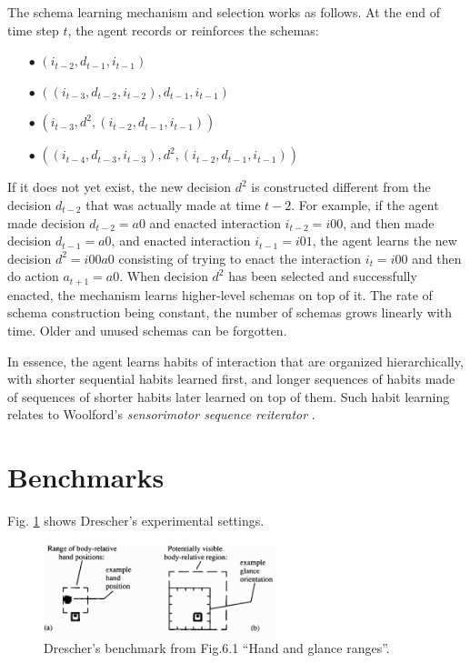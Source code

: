 \documentclass[runningheads]{llncs}
\begin{document}
The schema learning mechanism and selection works as follows.
At the end of time step $t$, the agent records or reinforces the schemas: 
\begin{itemize}
	\item[$\bullet$] $(i_{t-2}, d_{t-1}, i_{t-1})$
	\item[$\bullet$] $((i_{t-3}, d_{t-2}, i_{t-2}), d_{t-1}, i_{t-1})$
	\item[$\bullet$] $(i_{t-3}, d^2, (i_{t-2}, d_{t-1}, i_{t-1}))$
	\item[$\bullet$] $((i_{t-4}, d_{t-3}, i_{t-3}), d^2, (i_{t-2}, d_{t-1}, i_{t-1}))$
\end{itemize}

If it does not yet exist, the new decision $d^2$ is constructed different from the decision $d_{t-2}$ that was actually made at time $t-2$. 
For example, if the agent made decision $d_{t-2} = a0$ and enacted interaction $i_{t-2}=i00$, and then made decision $d_{t-1} = a0$, and enacted interaction $i_{t-1}=i01$, the agent learns the new decision $d^2=i00a0$ consisting of trying to enact the interaction $i_t=i00$ and then do action $a_{t+1}=a0$. 
When decision $d^2$ has been selected and successfully enacted, the mechanism learns higher-level schemas on top of it. 
The rate of schema construction being constant, the number of schemas grows linearly with time. 
Older and unused schemas can be forgotten.

In essence, the agent learns habits of interaction that are organized hierarchically, with shorter sequential habits learned first, and longer sequences of habits made of sequences of shorter habits later learned on top of them. 
Such habit learning relates to Woolford's \textit{sensorimotor sequence reiterator} \cite{woolford_precarious_2020}.

\section{Benchmarks}
\label{sec:benchmarks}

Fig. \ref{fig:drescher2} shows Drescher's experimental settings.


\begin{figure}
	\centering
	\includegraphics[width=0.6\textwidth]{Figure_drescher_expe.png}
	\caption{Drescher's benchmark from \cite{drescher_made-up_1991} Fig.6.1 ``Hand and glance ranges''.} 
	\label{fig:drescher2}
\end{figure}
\end{document}
